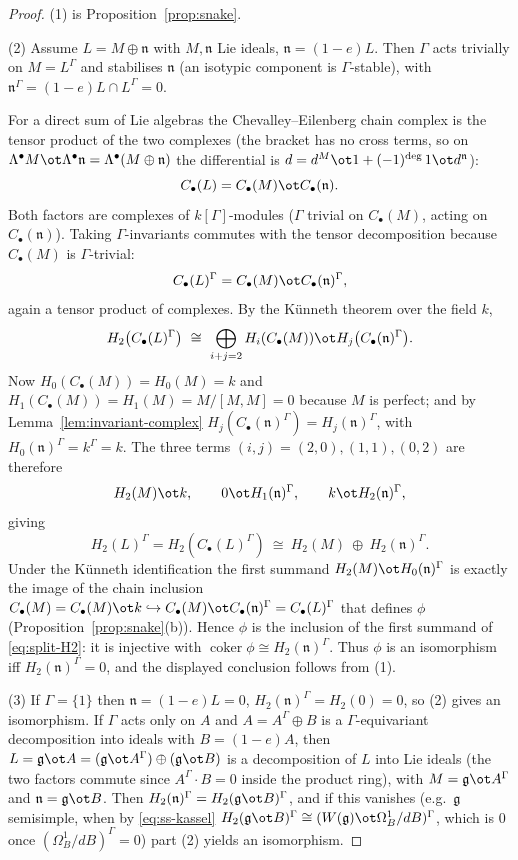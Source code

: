 \documentclass{amsart}
\theoremstyle{definition}
\newcommand{\g}{\mathfrak{g}}
\newcommand{\nn}{\mathfrak{n}}
\newcommand{\Om}{\Omega}
\newcommand{\Gm}{\Gamma}
\begin{document}
\begin{proof}
(1) is Proposition~\ref{prop:snake}.

\smallskip
(2) Assume $L=M\oplus\nn$ with $M,\nn$ Lie ideals, $\nn=(1-e)L$.  Then $\Gm$ acts
trivially on $M=L^{\Gm}$ and stabilises $\nn$ (an isotypic component is
$\Gm$-stable), with $\nn^{\Gm}=(1-e)L\cap L^{\Gm}=0$.

For a direct sum of Lie algebras the Chevalley--Eilenberg chain complex is the
tensor product of the two complexes (the bracket has no cross terms, so on
$\Lambda^\bullet M\ot\Lambda^\bullet\nn=\Lambda^\bullet(M\oplus\nn)$ the
differential is $d=d^M\ot1+(-1)^{\deg}\,1\ot d^{\nn}$):
\[
   C_\bullet(L)=C_\bullet(M)\ot C_\bullet(\nn).
\]
Both factors are complexes of $k[\Gm]$-modules ($\Gm$ trivial on $C_\bullet(M)$,
acting on $C_\bullet(\nn)$).  Taking $\Gm$-invariants commutes with the tensor
decomposition because $C_\bullet(M)$ is $\Gm$-trivial:
\[
   C_\bullet(L)^{\Gm}=C_\bullet(M)\ot C_\bullet(\nn)^{\Gm},
\]
again a tensor product of complexes.  By the K\"unneth theorem over the field $k$,
\[
   H_2\bigl(C_\bullet(L)^{\Gm}\bigr)\ \cong\
   \bigoplus_{i+j=2}H_i(C_\bullet(M))\ot H_j\bigl(C_\bullet(\nn)^{\Gm}\bigr).
\]
Now $H_0(C_\bullet(M))=H_0(M)=k$ and $H_1(C_\bullet(M))=H_1(M)=M/[M,M]=0$ because
$M$ is perfect; and by Lemma~\ref{lem:invariant-complex}
$H_j(C_\bullet(\nn)^{\Gm})=H_j(\nn)^{\Gm}$, with $H_0(\nn)^{\Gm}=k^{\Gm}=k$.  The
three terms $(i,j)=(2,0),(1,1),(0,2)$ are therefore
\[
   H_2(M)\ot k,\qquad 0\ot H_1(\nn)^{\Gm},\qquad k\ot H_2(\nn)^{\Gm},
\]
giving
\begin{equation}\label{eq:split-H2}
   H_2(L)^{\Gm}=H_2(C_\bullet(L)^{\Gm})\ \cong\ H_2(M)\ \oplus\ H_2(\nn)^{\Gm}.
\end{equation}
Under the K\"unneth identification the first summand $H_2(M)\ot H_0(\nn)^{\Gm}$ is
exactly the image of the chain inclusion $C_\bullet(M)=C_\bullet(M)\ot k\hookrightarrow
C_\bullet(M)\ot C_\bullet(\nn)^{\Gm}=C_\bullet(L)^{\Gm}$ that defines $\phi$
(Proposition~\ref{prop:snake}(b)).  Hence $\phi$ is the inclusion of the first
summand of \eqref{eq:split-H2}: it is injective with
$\operatorname{coker}\phi\cong H_2(\nn)^{\Gm}$.  Thus $\phi$ is an isomorphism iff
$H_2(\nn)^{\Gm}=0$, and the displayed conclusion follows from (1).

\smallskip
(3) If $\Gm=\{1\}$ then $\nn=(1-e)L=0$, $H_2(\nn)^{\Gm}=H_2(0)=0$, so (2) gives an
isomorphism.  If $\Gm$ acts only on $A$ and $A=A^{\Gm}\oplus B$ is a
$\Gm$-equivariant decomposition into ideals with $B=(1-e)A$, then
$L=\g\ot A=(\g\ot A^{\Gm})\oplus(\g\ot B)$ is a decomposition of $L$ into Lie ideals
(the two factors commute since $A^{\Gm}\cdot B=0$ inside the product ring), with
$M=\g\ot A^{\Gm}$ and $\nn=\g\ot B$.  Then $H_2(\nn)^{\Gm}=H_2(\g\ot B)^{\Gm}$, and
if this vanishes (e.g.\ $\g$ semisimple, when by \eqref{eq:ss-kassel}
$H_2(\g\ot B)^{\Gm}\cong(W(\g)\ot\Om^1_B/dB)^{\Gm}$, which is $0$ once
$(\Om^1_B/dB)^{\Gm}=0$) part (2) yields an isomorphism.


\end{proof}
\end{document}

